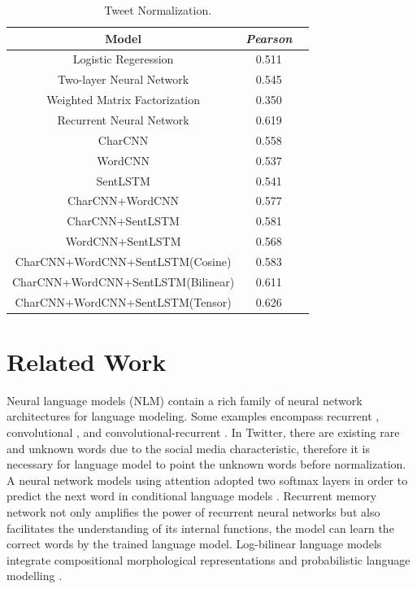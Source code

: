 \documentclass[letterpaper]{article}
\begin{document}
\begin{table}
	\begin{center}
		\begin{tabular}{| c | c | c | }
			\hline
			\bf Model & \bf \textit{Pearson}  \\ \hline
			Logistic Regeression \cite{das-smith:2009:ACLIJCNLP} & 0.511   \\ \hline
			Two-layer Neural Network \cite{bertero-fung:2015:SemEval} & 0.545   \\ 
			\hline
			Weighted Matrix Factorization \cite{guo-diab:2012:ACL2012} & 0.350   \\ 
			\hline
			Recurrent Neural Network \cite{zarrella-EtAl:2015:SemEval} & 0.619   \\ 
			\hline
			CharCNN  & 0.558   \\ 
			\hline
			WordCNN  & 0.537   \\ 
			\hline
			SentLSTM & 0.541   \\ 
			\hline
			CharCNN+WordCNN  & 0.577  \\ 
			\hline
			CharCNN+SentLSTM  & 0.581  \\ 
			\hline
			WordCNN+SentLSTM  & 0.568  \\ 
			\hline
			CharCNN+WordCNN+SentLSTM(Cosine) & 0.583  \\ 
			\hline
			CharCNN+WordCNN+SentLSTM(Bilinear) & 0.611  \\ 
			\hline
			CharCNN+WordCNN+SentLSTM(Tensor) & 0.626  \\ 
			\hline
		\end{tabular}
		\caption{Tweet Normalization.}
	\end{center}
\end{table}



\section{Related Work}
Neural language models (NLM) contain a rich family of neural network architectures for language modeling. Some examples encompass recurrent \cite{mikolov2010recurrent}, convolutional \cite{wang-EtAl:2015:ACL-IJCNLP3}, and convolutional-recurrent \cite{Kim-AAAI1612489}. In Twitter, there are existing rare and unknown words due to the social media characteristic,  therefore it is necessary for language model to point the unknown words before normalization. A neural network models using attention adopted two softmax layers in order to predict the next word in conditional language models \cite{gulcehre-EtAl:2016:P16-1}. Recurrent memory network \cite{tran-bisazza-monz:2016:N16-1} not only amplifies the power of recurrent neural networks but also facilitates the understanding of its internal functions, the model can learn the correct words by the trained language model. Log-bilinear language models integrate compositional morphological representations and probabilistic language modelling \cite{jan-phil:2014:icml}.
\end{document}
